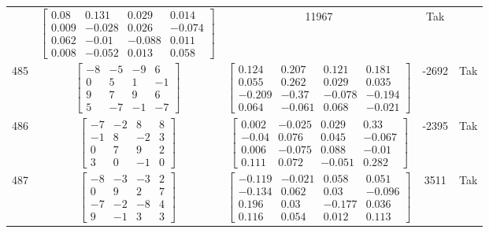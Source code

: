 \documentclass[a4paper,12pt]{article}
\begin{document}
\begin{tabular}{c c c c c}
&
$\begin{bmatrix} 0.08 & 0.131 & 0.029 & 0.014 \\ 0.009 & -0.028 & 0.026 & -0.074 \\ 0.062 & -0.01 & -0.088 & 0.011 \\ 0.008 & -0.052 & 0.013 & 0.058 \end{bmatrix}$
&
11967
&
Tak
\\
485
&
$\begin{bmatrix} -8 & -5 & -9 & 6 \\ 0 & 5 & 1 & -1 \\ 9 & 7 & 9 & 6 \\ 5 & -7 & -1 & -7 \end{bmatrix}$
&
$\begin{bmatrix} 0.124 & 0.207 & 0.121 & 0.181 \\ 0.055 & 0.262 & 0.029 & 0.035 \\ -0.209 & -0.37 & -0.078 & -0.194 \\ 0.064 & -0.061 & 0.068 & -0.021 \end{bmatrix}$
&
-2692
&
Tak
\\
486
&
$\begin{bmatrix} -7 & -2 & 8 & 8 \\ -1 & 8 & -2 & 3 \\ 0 & 7 & 9 & 2 \\ 3 & 0 & -1 & 0 \end{bmatrix}$
&
$\begin{bmatrix} 0.002 & -0.025 & 0.029 & 0.33 \\ -0.04 & 0.076 & 0.045 & -0.067 \\ 0.006 & -0.075 & 0.088 & -0.01 \\ 0.111 & 0.072 & -0.051 & 0.282 \end{bmatrix}$
&
-2395
&
Tak
\\
487
&
$\begin{bmatrix} -8 & -3 & -3 & 2 \\ 0 & 9 & 2 & 7 \\ -7 & -2 & -8 & 4 \\ 9 & -1 & 3 & 3 \end{bmatrix}$
&
$\begin{bmatrix} -0.119 & -0.021 & 0.058 & 0.051 \\ -0.134 & 0.062 & 0.03 & -0.096 \\ 0.196 & 0.03 & -0.177 & 0.036 \\ 0.116 & 0.054 & 0.012 & 0.113 \end{bmatrix}$
&
3511
&
Tak
\\

\end{tabular}
\end{document}
